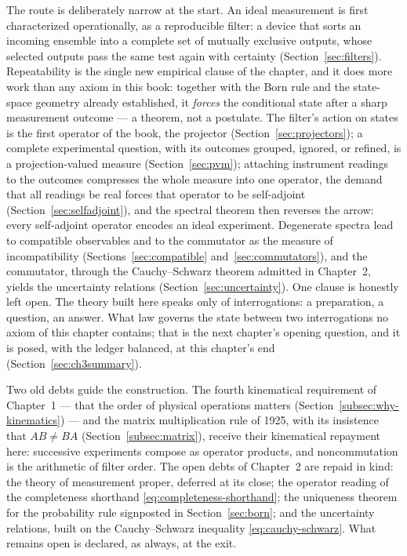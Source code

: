 The route is deliberately narrow at the start. An ideal measurement is first characterized operationally, as a reproducible filter: a device that sorts an incoming ensemble into a complete set of mutually exclusive outputs, whose selected outputs pass the same test again with certainty (Section~\ref{sec:filters}). Repeatability is the single new empirical clause of the chapter, and it does more work than any axiom in this book: together with the Born rule and the state-space geometry already established, it \emph{forces} the conditional state after a sharp measurement outcome --- a theorem, not a postulate. The filter's action on states is the first operator of the book, the projector (Section~\ref{sec:projectors}); a complete experimental question, with its outcomes grouped, ignored, or refined, is a projection-valued measure (Section~\ref{sec:pvm}); attaching instrument readings to the outcomes compresses the whole measure into one operator, the demand that all readings be real forces that operator to be self-adjoint (Section~\ref{sec:selfadjoint}), and the spectral theorem then reverses the arrow: every self-adjoint operator encodes an ideal experiment. Degenerate spectra lead to compatible observables and to the commutator as the measure of incompatibility (Sections~\ref{sec:compatible} and~\ref{sec:commutators}), and the commutator, through the Cauchy--Schwarz theorem admitted in Chapter~2, yields the uncertainty relations (Section~\ref{sec:uncertainty}). One clause is honestly left open. The theory built here speaks only of interrogations: a preparation, a question, an answer. What law governs the state between two interrogations no axiom of this chapter contains; that is the next chapter's opening question, and it is posed, with the ledger balanced, at this chapter's end (Section~\ref{sec:ch3summary}).

Two old debts guide the construction. The fourth kinematical requirement of Chapter~1 --- that the order of physical operations matters (Section~\ref{subsec:why-kinematics}) --- and the matrix multiplication rule of 1925, with its insistence that $AB\neq BA$ (Section~\ref{subsec:matrix}), receive their kinematical repayment here: successive experiments compose as operator products, and noncommutation is the arithmetic of filter order. The open debts of Chapter~2 are repaid in kind: the theory of measurement proper, deferred at its close; the operator reading of the completeness shorthand \eqref{eq:completeness-shorthand}; the uniqueness theorem for the probability rule signposted in Section~\ref{sec:born}; and the uncertainty relations, built on the Cauchy--Schwarz inequality \eqref{eq:cauchy-schwarz}. What remains open is declared, as always, at the exit.

